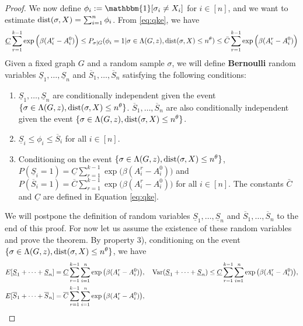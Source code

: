 \documentclass{article}
\begin{document}
\begin{proof}
	We now define 
	$\phi_i := \mathbbm{1}[\sigma_i \neq X_i]$ for $i\in[n]$, and
	we want to estimate $\operatorname{dist}(\sigma,X)=\sum_{i=1}^n \phi_i$.
	From \eqref{eq:qke},
	we have
	\begin{equation}\label{eq:soon}
	\underline{C}\sum_{r=1}^{k-1}\exp\Big(\beta(A^r_i-A^0_i) \Big)  \le 
	P_{\sigma|G}(\phi_i = 1 | \sigma \in \Lambda(G, z),
	\operatorname{dist}(\sigma, X) \leq n^{\theta})
	\le \bar{C} \sum_{r=1}^{k-1}\exp\Big(\beta (A^r_i-A^0_i ) \Big) 
	\end{equation}
	Given a fixed graph $G$ and a random sample $\sigma$, we will define {\bf Bernoulli} random variables $\underline{S}_1,\dots, \underline{S}_n$ and $\overline{S}_1,\dots,\overline{S}_n$ satisfying the following conditions:
	\begin{enumerate}
		\item $\underline{S}_1,\dots, \underline{S}_n$ are conditionally independent given the event $\{\sigma\in \Lambda(G,z) ,\operatorname{dist}(\sigma, X) \le n^{\theta}\}$. $\overline{S}_1,\dots,\overline{S}_n$ are also conditionally independent given the event $\{\sigma\in \Lambda(G,z) ,\operatorname{dist}(\sigma, X) \le n^{\theta}\}$.
		\item $\underline{S}_i\le \phi_i\le \overline{S}_i$ for all $i\in[n]$.
		\item Conditioning on the event $\{\sigma\in \Lambda(G,z) ,\operatorname{dist}(\sigma, X) \le n^{\theta}\}$, $P(\underline{S}_i=1)=\underline{C}
		\sum_{r=1}^{k-1}\exp\big(\beta (A^r_i-A^0_i) \big)$ and $P(\overline{S}_i=1)=\overline{C}
		\sum_{r=1}^{k-1}\exp\big(\beta (A^r_i-A^0_i) \big)$ for all $i\in[n]$. The constants $\bar{C}$ and $\underline{C}$ are defined in Equation \eqref{eq:qke}.
	\end{enumerate}
	We will postpone the definition of random variables $\underline{S}_1,\dots, \underline{S}_n$ and $\overline{S}_1,\dots,\overline{S}_n$ to the end of this proof. For now let us assume the existence of these random variables and prove the theorem.
	By property 3), conditioning on the event $\{\sigma\in \Lambda(G,z) ,\operatorname{dist}(\sigma, X) \le n^{\theta}\}$, we have
	\begin{align*}
	& E[\underline{S}_1 + \dots + \underline{S}_n] = \underline{C}
	\sum_{r=1}^{k-1}\sum_{i=1}^n \exp\big(\beta (A^r_i-A^0_i) \big) , \quad
	\Var(\underline{S}_1 + \dots + \underline{S}_n) \le \underline{C}
	\sum_{r=1}^{k-1}\sum_{i=1}^n \exp\big(\beta (A^r_i-A^0_i) \big)
	, \\
	& E[\overline{S}_1 + \dots + \overline{S}_n] = \overline{C}
	\sum_{r=1}^{k-1}\sum_{i=1}^n \exp\big(\beta (A^r_i-A^0_i) \big) , \quad

\end{align*}
\end{proof}
\end{document}
